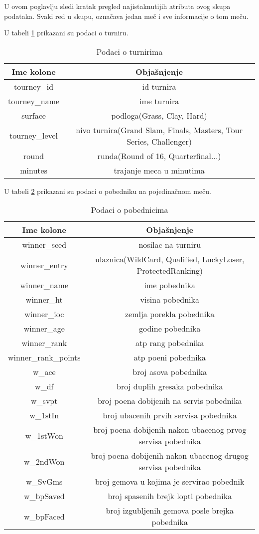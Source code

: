 \documentclass[a4paper]{article}
\begin{document}
U ovom poglavlju sledi kratak pregled najistaknutijih atributa ovog skupa podataka.
Svaki red u skupu, označava jedan meč i sve informacije o tom meču.

U tabeli \ref{table:turnir} prikazani su podaci o turniru.
\begin{table}
		\begin{tabular}{ | c | c | } 
			\hline
			Ime kolone & Objašnjenje \\ 
			\hline
			tourney\_id & id turnira \\
			tourney\_name & ime turnira \\
			surface & podloga(Grass, Clay, Hard) \\
			tourney\_level & nivo turnira(Grand Slam, Finals, Masters, Tour Series, Challenger) \\ 
			round & runda(Round of 16, Quarterfinal...) \\
			minutes & trajanje meca u minutima \\
			\hline
		\end{tabular}
	\caption{Podaci o turnirima}
	\label{table:turnir}
\end{table}

U tabeli \ref{table:pobednici} prikazani su podaci o pobedniku na pojedinačnom meču.
\begin{table}
		\begin{tabular}{ | c | c | } 
			\hline
			Ime kolone & Objašnjenje \\ 
			\hline
			winner\_seed & nosilac na turniru \\
			winner\_entry & ulaznica(WildCard, Qualified, LuckyLoser, ProtectedRanking) \\
			winner\_name & ime pobednika \\
			winner\_ht & visina pobednika \\
			winner\_ioc & zemlja porekla pobednika \\
			winner\_age & godine pobednika \\
			winner\_rank & atp rang pobednika \\
			winner\_rank\_points & atp poeni pobednika \\
			w\_ace & broj asova pobednika \\
			w\_df & broj duplih gresaka pobednika \\ 
			w\_svpt & broj poena dobijenih na servis pobednika \\
			w\_1stIn & broj ubacenih prvih servisa pobednika \\
			w\_1stWon & broj poena dobijenih nakon ubacenog prvog servisa pobednika \\
			w\_2ndWon & broj poena dobijenih nakon ubacenog drugog servisa pobednika \\
			w\_SvGms & broj gemova u kojima je servirao pobednik \\
			w\_bpSaved & broj spasenih brejk lopti pobednika \\
			w\_bpFaced & broj izgubljenih gemova posle brejka pobednika \\ 
			\hline
		\end{tabular}
	\caption{Podaci o pobednicima}
	\label{table:pobednici}
\end{table}
\end{document}
